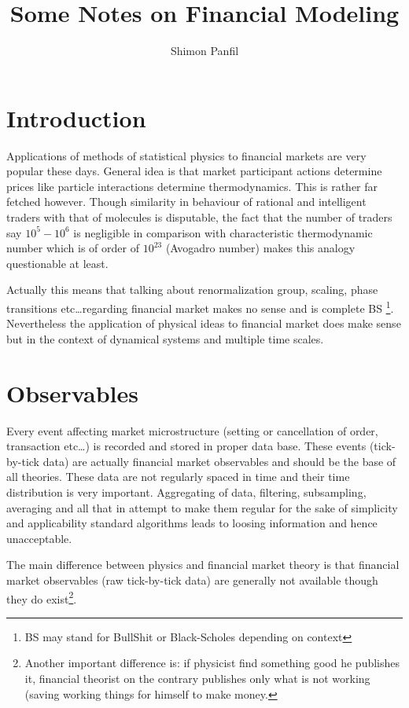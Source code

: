 \documentclass[12pt]{article}
\title{Some Notes on Financial Modeling}
\author{Shimon Panfil}
\begin{document}
\maketitle
\section{Introduction}
Applications of methods of statistical physics  to financial markets are very popular these days. General idea is that market participant actions determine prices like particle interactions determine thermodynamics. This is rather far fetched however. Though similarity in behaviour of rational  and intelligent traders with that of molecules is disputable, the fact that the number of traders say $10^5-10^6$ is negligible in comparison with characteristic thermodynamic number which is of order of $10^{23}$ (Avogadro number)  makes this analogy questionable at least.

Actually this means that talking about renormalization group, scaling, phase  transitions etc\ldots regarding financial market makes no sense and is complete BS \footnote{BS may stand for BullShit or Black-Scholes depending on  context}. Nevertheless the application of physical ideas to financial market does make sense but in the context of dynamical systems and multiple time scales.

\section{Observables}
Every event affecting market microstructure (setting or cancellation of order, transaction etc\ldots) is recorded and stored in proper data base. These events (tick-by-tick data) are actually financial market observables and  should be the base of all theories. These data are not regularly spaced in time and their time distribution is very important. Aggregating of data, filtering, subsampling, averaging and all that in attempt to make them regular for the sake of simplicity and applicability standard algorithms leads to loosing information and hence unacceptable.

The main difference between physics and financial market theory is that financial market observables (raw tick-by-tick data)  are generally not available though they do exist\footnote{Another important difference is: if physicist find something good he publishes it, financial theorist on the contrary publishes only what is not working (saving working things for himself to make money.}.
\end{document}
